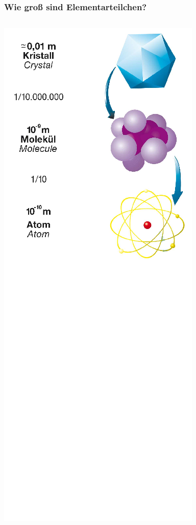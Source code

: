 \documentclass{beamer}
\begin{document}
\begin{frame}
  \frametitle{Wie gro\ss{} sind Elementarteilchen?}
  \vskip-0.2cm
  \begin{columns}[T]
    \begin{column}{0.25\textwidth}
      \centering
      \includegraphics[width=\textwidth]{matter/VKZQ_Atom.png}

\end{column}
\end{columns}
\end{frame}
\end{document}
